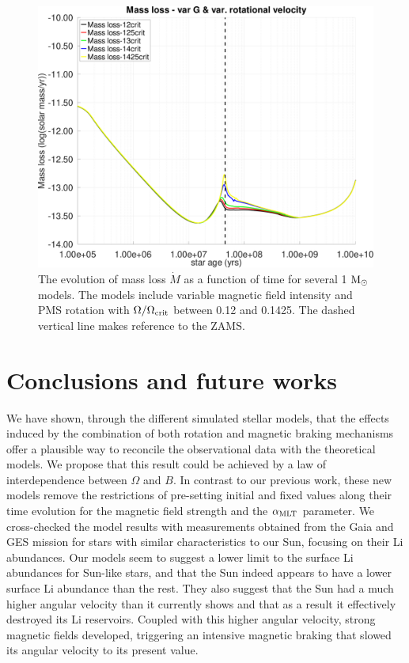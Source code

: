 \documentclass[fleqn,usenatbib]{mnras}
\begin{document}
\begin{ceqn}
\begin{figure}
	\includegraphics[clip,width=\columnwidth]{figures/paper2/mdot_var_vel_g3.pdf}
    \caption{The evolution of mass loss $\Dot{M}$ as a function of time for several 1 $\mathrm{M}_\odot$ models. The models include variable magnetic field intensity and PMS rotation with $\Omega / \Omega_{\mathrm{crit}}$ between 0.12 and 0.1425. The dashed vertical line makes reference to the ZAMS.}
    \label{fig:mdot_var_vel_g3}
\end{figure}

\section{Conclusions and future works} \label{sec_conclusions}
We have shown, through the different simulated stellar models, that the effects induced by the combination of both rotation and magnetic braking mechanisms offer a plausible way to reconcile the observational data with the theoretical models. We propose that this result could be achieved by a law of interdependence between $\Omega$ and $B$. In contrast to our previous work, these new models remove the restrictions of pre-setting initial and fixed values along their time evolution for the magnetic field strength and the $\alpha_{\mathrm{MLT}}$ parameter. We cross-checked the model results with measurements obtained from the Gaia and GES mission for stars with similar characteristics to our Sun, focusing on their Li abundances. Our models seem to suggest a lower limit to the surface Li abundances for Sun-like stars, and that the Sun indeed appears to have a lower surface Li abundance than the rest. They also suggest that the Sun had a much higher angular velocity than it currently shows and that as a result it effectively destroyed its Li reservoirs. Coupled with this higher angular velocity, strong magnetic fields developed, triggering an intensive magnetic braking that slowed its angular velocity to its present value.\par


\end{ceqn}
\end{document}
